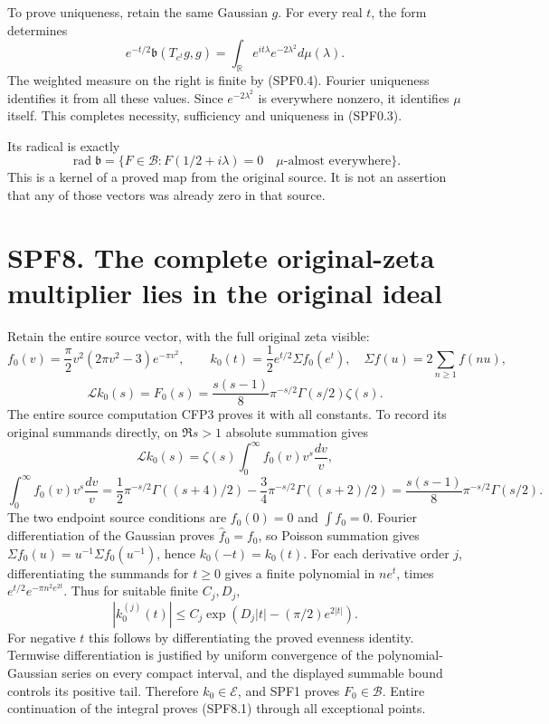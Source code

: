 To prove uniqueness, retain the same Gaussian \(g\). For every real
\(t\), the form determines \[
e^{-t/2}\mathfrak b(T_{e^t}g,g)
=\int_{\mathbb R}e^{it\lambda}e^{-2\lambda^2}d\mu(\lambda).
\tag{SPF7.2}
\] The weighted measure on the right is finite by (SPF0.4). Fourier
uniqueness identifies it from all these values. Since
\(e^{-2\lambda^2}\) is everywhere nonzero, it identifies \(\mu\) itself.
This completes necessity, sufficiency and uniqueness in (SPF0.3).

Its radical is exactly \[
\operatorname{rad}\mathfrak b
=\{F\in\mathcal B:F(1/2+i\lambda)=0\quad\mu\text{-almost everywhere}\}.
\tag{SPF7.3}
\] This is a kernel of a proved map from the original source. It is not
an assertion that any of those vectors was already zero in that source.

\section{SPF8. The complete original-zeta multiplier lies in the
original
ideal}\label{spf8.-the-complete-original-zeta-multiplier-lies-in-the-original-ideal}

Retain the entire source vector, with the full original zeta visible: \[
f_0(v)=\frac\pi2v^2(2\pi v^2-3)e^{-\pi v^2},\qquad
k_0(t)=\frac12e^{t/2}\Sigma f_0(e^t),
\quad\Sigma f(u)=2\sum_{n\ge1}f(nu),
\] \[
\boxed{\mathcal Lk_0(s)=F_0(s)
=\frac{s(s-1)}8\pi^{-s/2}\Gamma(s/2)\zeta(s).}
\tag{SPF8.1}
\] The entire source computation CFP3 proves it with all constants. To
record its original summands directly, on \(\Re s>1\) absolute summation
gives \[
\mathcal Lk_0(s)=\zeta(s)\int_0^\infty f_0(v)v^s\frac{dv}{v},
\] \[
\int_0^\infty f_0(v)v^s\frac{dv}{v}
=\frac12\pi^{-s/2}\Gamma((s+4)/2)
-\frac34\pi^{-s/2}\Gamma((s+2)/2)
=\frac{s(s-1)}8\pi^{-s/2}\Gamma(s/2).
\tag{SPF8.2}
\] The two endpoint source conditions are \(f_0(0)=0\) and
\(\int f_0=0\). Fourier differentiation of the Gaussian proves
\(\widehat f_0=f_0\), so Poisson summation gives
\(\Sigma f_0(u)=u^{-1}\Sigma f_0(u^{-1})\), hence \(k_0(-t)=k_0(t)\).
For each derivative order \(j\), differentiating the summands for
\(t\ge0\) gives a finite polynomial in \(ne^t\), times
\(e^{t/2}e^{-\pi n^2e^{2t}}\). Thus for suitable finite \(C_j,D_j\), \[
|k_0^{(j)}(t)|\le C_j
\exp(D_j|t|-(\pi/2)e^{2|t|}).
\tag{SPF8.3}
\] For negative \(t\) this follows by differentiating the proved
evenness identity. Termwise differentiation is justified by uniform
convergence of the polynomial-Gaussian series on every compact interval,
and the displayed summable bound controls its positive tail. Therefore
\(k_0\in\mathcal E\), and SPF1 proves \(F_0\in\mathcal B\). Entire
continuation of the integral proves (SPF8.1) through all exceptional
points.

